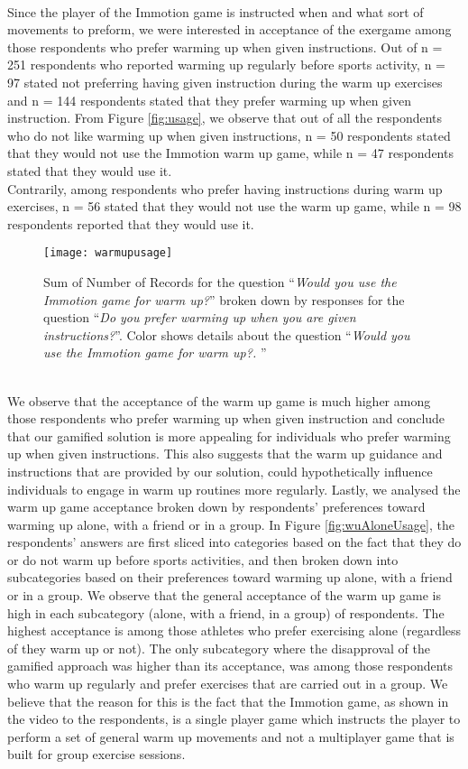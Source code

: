 \\Since the player of the Immotion game is instructed when and what sort of movements to preform, we were interested in acceptance of the exergame among those respondents who prefer warming up when given instructions. Out of n = 251 respondents who reported warming up regularly before sports activity, n = 97 stated not preferring having given instruction during the warm up exercises and n = 144 respondents stated that they prefer warming up when given instruction. From Figure  \ref{fig:usage}, we observe that out of all the respondents who do not like warming up when given instructions, n = 50 respondents stated that they would not use the Immotion warm up game, while n = 47 respondents stated that they would use it. \\Contrarily, among respondents who prefer having instructions during warm up exercises, n = 56 stated that they would not use the warm up game, while n = 98 respondents reported that they would use it.\\
\begin{figure}[h]
    \centering
    \texttt{[image: warmupusage]}
    \caption [Results for the Immotion prototype related question.]{Sum of Number of Records for the question ``\textit{Would you use the Immotion game for warm up?}'' broken down by responses for the question ``\textit{Do you prefer warming up when you are given instructions?}''. Color shows details about the question ``\textit{Would you use the Immotion game for warm up?. }''}
    \label{fig:warmupusage}
\end{figure}\\
We observe that the acceptance of the warm up game is much higher among those respondents who prefer warming up when given instruction and conclude that our gamified solution is more appealing for individuals who prefer warming up when given instructions. This also suggests that the warm up guidance and instructions that are provided by our solution, could hypothetically influence individuals to engage in warm up routines more regularly. Lastly, we analysed the warm up game acceptance broken down by respondents' preferences toward warming up alone, with a friend or in a group. In Figure \ref{fig:wuAloneUsage}, the respondents' answers are first sliced into categories based on the fact that they do or do not warm up before sports activities, and then broken down into subcategories based on their preferences toward warming up alone, with a friend or in a group. We observe that the general acceptance of the warm up game is high in each subcategory (alone, with a friend, in a group) of respondents. The highest acceptance is among those athletes who prefer exercising alone (regardless of they warm up or not). The only subcategory where the disapproval of the gamified approach was higher than its acceptance, was among those respondents who warm up regularly and prefer exercises that are carried out in a group. We believe that the reason for this is the fact that the Immotion game, as shown in the video to the respondents, is a single player game which instructs the player to perform a set of general warm up movements and not a multiplayer game that is built for group exercise sessions. 
